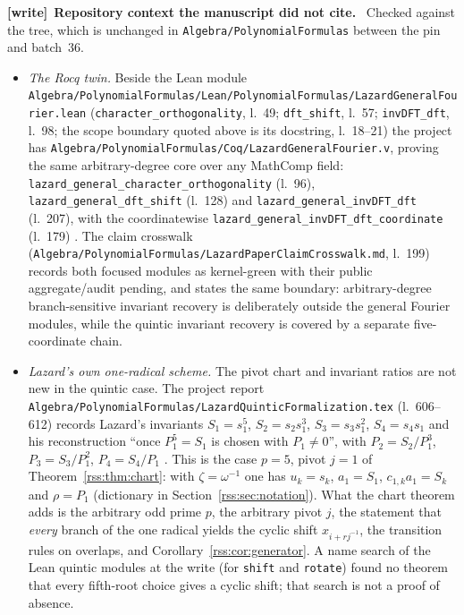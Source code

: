 \documentclass[11pt,a4paper]{article}
\theoremstyle{definition}
\theoremstyle{remark}
\newcommand{\code}[1]{{\small\nolinkurl{#1}}}
\newenvironment{writenote}[1][]{\par\smallskip\begingroup\small
 \noindent\textbf{[write]}\if\relax\detokenize{#1}\relax\else~\textbf{#1.}\fi\ }%
 {\par\endgroup\smallskip}
\newcommand{\repo}[1]{\code{#1}}
\begin{document}
\begin{writenote}[Repository context the manuscript did not cite]
Checked against the tree, which is unchanged in
\code{Algebra/PolynomialFormulas} between the pin and batch~36.
\begin{itemize}
\item \emph{The Rocq twin.} Beside the Lean module
\repo{Algebra/PolynomialFormulas/Lean/PolynomialFormulas/LazardGeneralFourier.lean}
(\code{character_orthogonality}, l.~49; \code{dft_shift}, l.~57;
\code{invDFT_dft}, l.~98; the scope boundary quoted above is its docstring,
l.~18--21) the project has
\repo{Algebra/PolynomialFormulas/Coq/LazardGeneralFourier.v}, proving the
same arbitrary-degree core over any MathComp field:
\code{lazard_general_character_orthogonality} (l.~96),
\code{lazard_general_dft_shift} (l.~128) and
\code{lazard_general_invDFT_dft} (l.~207), with the coordinatewise
\code{lazard_general_invDFT_dft_coordinate} (l.~179)
\cite{repoFourierRocq}. The claim crosswalk
(\repo{Algebra/PolynomialFormulas/LazardPaperClaimCrosswalk.md}, l.~199) records both focused modules
as kernel-green with their public aggregate/audit pending, and states the
same boundary: arbitrary-degree branch-sensitive invariant recovery is
deliberately outside the general Fourier modules, while the quintic
invariant recovery is covered by a separate five-coordinate chain.
\item \emph{Lazard's own one-radical scheme.} The pivot chart and invariant
ratios are not new in the quintic case. The project report
\repo{Algebra/PolynomialFormulas/LazardQuinticFormalization.tex}
(l.~606--612) records Lazard's
invariants $S_1=s_1^5$, $S_2=s_2s_1^3$, $S_3=s_3s_1^2$, $S_4=s_4s_1$ and his
reconstruction ``once $P_1^5=S_1$ is chosen with $P_1\neq0$'', with
$P_2=S_2/P_1^3$, $P_3=S_3/P_1^2$, $P_4=S_4/P_1$ \cite{repoReport}. This is
the case $p=5$, pivot $j=1$ of Theorem~\ref{rss:thm:chart}: with
$\zeta=\omega^{-1}$ one has $u_k=s_k$, $a_1=S_1$, $c_{1,k}a_1=S_k$ and
$\rho=P_1$ (dictionary in Section~\ref{rss:sec:notation}). What the chart
theorem adds is the arbitrary odd prime $p$, the arbitrary pivot $j$, the
statement that \emph{every} branch of the one radical yields the cyclic
shift $x_{i+rj^{-1}}$, the transition rules on overlaps, and
Corollary~\ref{rss:cor:generator}. A name search of the Lean quintic modules
at the write (for \code{shift} and \code{rotate}) found no theorem that every
fifth-root choice gives a cyclic shift; that search is not a proof of
absence.
\end{itemize}
\end{writenote}
\end{document}
